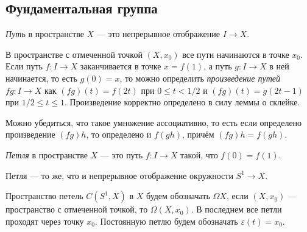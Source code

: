 \subsection{Фундаментальная группа}
\begin{defin}
	\textit{Путь} в пространстве $X$ --- это непрерывное отображение $I\to X$.
\end{defin}
В пространстве с отмеченной точкой $(X,x_0)$ все пути начинаются в точке $x_0$. Если путь $f\colon I\to X$ заканчивается в точке $x=f(1)$, а путь $g\colon I\to X$ в ней начинается, то есть $g(0)=x$, то можно определить \textit{произведение путей} $fg\colon I\to X$ как $(fg)(t)=f(2t)$ при $0\leqslant t<1/2$ и $(fg)(t)=g(2t-1)$ при $1/2\leqslant t\leqslant 1$. Произведение корректно определено в силу леммы о склейке.

Можно убедиться, что такое умножение ассоциативно, то есть если определено произведение $(fg)h$, то определено и $f(gh)$, причём $(fg)h=f(gh)$.

\begin{defin}
	\textit{Петля} в пространстве $X$ --- это путь $f\colon I\to X$ такой, что $f(0)=f(1)$.
\end{defin}
Петля --- то же, что и непрерывное отображение окружности $S^1\to X$.

Пространство петель $C(S^1,X)$ в $X$ будем обозначать $\Omega X$, если $(X,x_0)$ --- пространство с отмеченной точкой, то $\Omega(X,x_0)$. В последнем все петли проходят через точку $x_0$. Постоянную петлю будем обозначать $\varepsilon(t)=x_0$.


